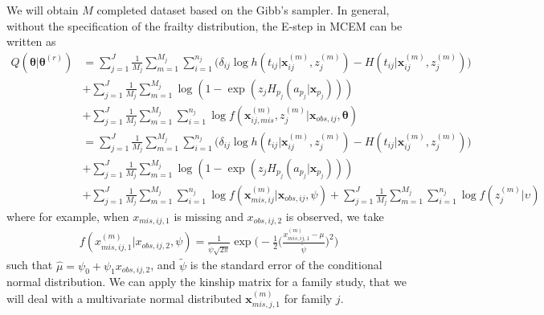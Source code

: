 \documentclass[preprint,12pt]{elsarticle}
\begin{document}
We will obtain $M$ completed dataset based on the Gibb's sampler. 
In general, without the specification of the frailty distribution, the E-step in MCEM can be written as 
\begin{align} 
    Q(\boldsymbol{\theta}|\boldsymbol{\theta}^{(r)})&=\sum_{j=1}^J \frac{1}{M_j}\sum_{m=1}^{M_j}\sum_{i=1}^{n_j} \Big ( \delta_{ij}\log h(t_{ij}|\mathbf{x}_{ij}^{(m)}, z_j^{(m)}) - H(t_{ij}|\mathbf{x}_{ij}^{(m)}, z_j^{(m)})\Big )\\
    &+\sum_{j=1}^J\frac{1}{M_j}\sum_{m=1}^{M_j}\log(1- \exp(z_j H_{p_j}(a_{p_j}|\mathbf{x}_{p_j})))\\
    &+\sum_{j=1}^J\frac{1}{M_j}\sum_{m=1}^{M_j}\sum_{i=1}^{n_j}\log f(\mathbf{x}_{ij,mis}^{(m)}, z_j^{(m)}|\mathbf{x}_{obs,ij}, \boldsymbol{\theta})\\
    &=\sum_{j=1}^J \frac{1}{M_j}\sum_{m=1}^{M_j}\sum_{i=1}^{n_j} \Big ( \delta_{ij}\log h(t_{ij}|\mathbf{x}_{ij}^{(m)}, z_j^{(m)}) - H(t_{ij}|\mathbf{x}_{ij}^{(m)}, z_j^{(m)})\Big )\\
    &+\sum_{j=1}^J\frac{1}{M_j}\sum_{m=1}^{M_j}\log(1- \exp(z_j H_{p_j}(a_{p_j}|\mathbf{x}_{p_j})))\\
    &+\sum_{j=1}^J\frac{1}{M_j}\sum_{m=1}^{M_j}\sum_{i=1}^{n_j}\log f(\mathbf{x}_{mis,ij}^{(m)}|\mathbf{x}_{obs,ij}, \psi)+\sum_{j=1}^J\frac{1}{M_j}\sum_{m=1}^{M_j}\sum_{i=1}^{n_j}\log f(z_j^{(m)}|\upsilon)
\end{align} 
where for example, when $x_{mis,ij,1}$ is missing and $x_{obs,ij,2}$ is observed, we take
\begin{align} 
    f(x_{mis,ij,1}^{(m)}|x_{obs,ij,2}, \psi)=\frac{1}{\tilde{\psi}\sqrt{2\pi}}\exp \Big (-\frac{1}{2}\Big (\frac{x_{mis,ij,1}^{(m)} - \mu}{\tilde{\psi}}\Big )^2\Big )
\end{align}
such that $\hat{\mu}=\psi_0 + \psi_1 x_{obs,ij,2}$, and $\tilde{\psi}$ is the standard error of the conditional normal distribution.
We can apply the kinship matrix for a family study, that we will deal with a multivariate normal distributed $\mathbf{x}_{mis,j,1}^{(m)}$ for family $j$. 
\end{document}
